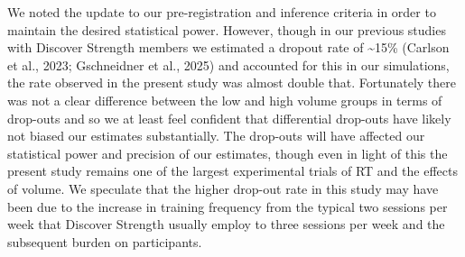 \documentclass[
]{article}
\begin{document}
We noted the update to our pre-registration and inference criteria in
order to maintain the desired statistical power. However, though in our
previous studies with Discover Strength members we estimated a dropout
rate of \textasciitilde15\% (Carlson et al., 2023; Gschneidner et al.,
2025) and accounted for this in our simulations, the rate observed in
the present study was almost double that. Fortunately there was not a
clear difference between the low and high volume groups in terms of
drop-outs and so we at least feel confident that differential drop-outs
have likely not biased our estimates substantially. The drop-outs will
have affected our statistical power and precision of our estimates,
though even in light of this the present study remains one of the
largest experimental trials of RT and the effects of volume. We
speculate that the higher drop-out rate in this study may have been due
to the increase in training frequency from the typical two sessions per
week that Discover Strength usually employ to three sessions per week
and the subsequent burden on participants.
\end{document}
